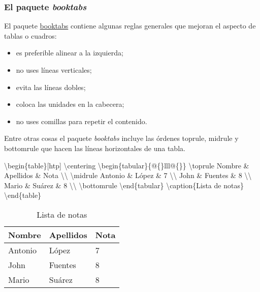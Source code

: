 \documentclass[11pt]{article}
\newenvironment{Shaded}{}{}
\newcommand{\NormalTok}[1]{{#1}}
\begin{document}
\subsubsection{El paquete \emph{booktabs}}\label{el-paquete-booktabs}

El paquete \href{http://ctan.org/pkg/booktabs}{booktabs} contiene
algunas reglas generales que mejoran el aspecto de tablas o cuadros:
\begin{itemize}
\itemsep1pt\parskip0pt
\item
  es preferible alinear a la izquierda;
\item
  no uses líneas verticales;
\item
  evita las líneas dobles;
\item
  coloca las unidades en la cabecera;
\item
  no uses comillas para repetir el contenido.
\end{itemize}

Entre otras cosas el paquete \emph{booktabs} incluye las órdenes
toprule, midrule y bottomrule que hacen las líneas horizontales de una
tabla.
\begin{Shaded}
\begin{Highlighting}[]
\NormalTok{\textbackslash{}begin\{table\}[htp]}
\NormalTok{\textbackslash{}centering}
\NormalTok{\textbackslash{}begin\{tabular\}\{@\{\}lll@\{\}\}}
\NormalTok{\textbackslash{}toprule}
\NormalTok{Nombre & Apellidos & Nota \textbackslash{}\textbackslash{}}
\NormalTok{\textbackslash{}midrule}
 \NormalTok{Antonio & López & 7 \textbackslash{}\textbackslash{}}
 \NormalTok{John & Fuentes & 8 \textbackslash{}\textbackslash{}}
 \NormalTok{Mario & Suárez & 8 \textbackslash{}\textbackslash{}}
\NormalTok{\textbackslash{}bottomrule}
\NormalTok{\textbackslash{}end\{tabular\}}
\NormalTok{\textbackslash{}caption\{Lista de notas\}}
\NormalTok{\textbackslash{}end\{table\}}
\end{Highlighting}
\end{Shaded}
\begin{table}[htp]
\centering
\begin{tabular}{@{}lll@{}}
\toprule
Nombre & Apellidos & Nota \\
\midrule
 Antonio & López & 7 \\
 John & Fuentes & 8 \\
 Mario & Suárez & 8 \\
\bottomrule
\end{tabular}
\caption{Lista de notas}
\end{table}
\end{document}
